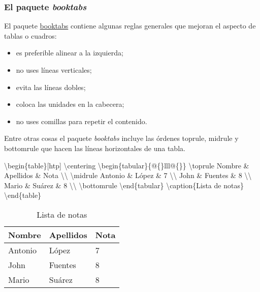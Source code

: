 \documentclass[11pt]{article}
\newenvironment{Shaded}{}{}
\newcommand{\NormalTok}[1]{{#1}}
\begin{document}
\subsubsection{El paquete \emph{booktabs}}\label{el-paquete-booktabs}

El paquete \href{http://ctan.org/pkg/booktabs}{booktabs} contiene
algunas reglas generales que mejoran el aspecto de tablas o cuadros:
\begin{itemize}
\itemsep1pt\parskip0pt
\item
  es preferible alinear a la izquierda;
\item
  no uses líneas verticales;
\item
  evita las líneas dobles;
\item
  coloca las unidades en la cabecera;
\item
  no uses comillas para repetir el contenido.
\end{itemize}

Entre otras cosas el paquete \emph{booktabs} incluye las órdenes
toprule, midrule y bottomrule que hacen las líneas horizontales de una
tabla.
\begin{Shaded}
\begin{Highlighting}[]
\NormalTok{\textbackslash{}begin\{table\}[htp]}
\NormalTok{\textbackslash{}centering}
\NormalTok{\textbackslash{}begin\{tabular\}\{@\{\}lll@\{\}\}}
\NormalTok{\textbackslash{}toprule}
\NormalTok{Nombre & Apellidos & Nota \textbackslash{}\textbackslash{}}
\NormalTok{\textbackslash{}midrule}
 \NormalTok{Antonio & López & 7 \textbackslash{}\textbackslash{}}
 \NormalTok{John & Fuentes & 8 \textbackslash{}\textbackslash{}}
 \NormalTok{Mario & Suárez & 8 \textbackslash{}\textbackslash{}}
\NormalTok{\textbackslash{}bottomrule}
\NormalTok{\textbackslash{}end\{tabular\}}
\NormalTok{\textbackslash{}caption\{Lista de notas\}}
\NormalTok{\textbackslash{}end\{table\}}
\end{Highlighting}
\end{Shaded}
\begin{table}[htp]
\centering
\begin{tabular}{@{}lll@{}}
\toprule
Nombre & Apellidos & Nota \\
\midrule
 Antonio & López & 7 \\
 John & Fuentes & 8 \\
 Mario & Suárez & 8 \\
\bottomrule
\end{tabular}
\caption{Lista de notas}
\end{table}
\end{document}
